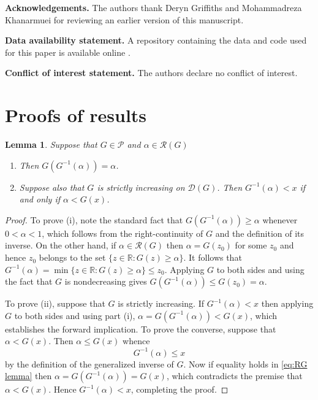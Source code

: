 \documentclass[10pt]{article} %
\theoremstyle{theorem}
\newtheorem{lem}{Lemma}
\theoremstyle{definition}
\newcommand{\RRR}{\mathbb{R}}
\newcommand{\RG}{\mathcal{R}(G)}
\begin{document}
\vspace{0.2cm}

\noindent\textbf{Acknowledgements.} The authors thank Deryn Griffiths and Mohammadreza Khanarmuei for reviewing an earlier version of this manuscript.

\vspace{0.2cm}

\noindent\textbf{Data availability statement.} A repository containing the data and code used for this paper is available online \citep{taggart2026code}.

\vspace{0.2cm}

\noindent\textbf{Conflict of interest statement.} The authors declare no conflict of interest.



\appendix

\section{Proofs of results}\label{a:proofs}



\begin{lem}\label{lem:alpha in RG}
Suppose that $G\in\mathcal{P}$ and $\alpha\in\RG$
\begin{enumerate}
\item[(i)] Then $G(G^{-1}(\alpha))=\alpha$.
\item[(ii)] Suppose also that $G$ is strictly increasing on $\mathcal{D}(G)$. Then $G^{-1}(\alpha) < x$ if and only if $\alpha < G(x)$.
\end{enumerate}
\end{lem}

\begin{proof}
To prove (i), note the standard fact that $G(G^{-1}(\alpha))\geq \alpha$ whenever $0<\alpha<1$, which follows from the right-continuity of $G$ and the definition of its inverse. On the other hand, if $\alpha\in\RG$ then $\alpha=G(z_0)$ for some $z_0$ and hence $z_0$ belongs to the set $\{z\in\RRR: G(z)\geq \alpha\}$. It follows that $G^{-1}(\alpha)=\min\{z\in\RRR: G(z)\geq \alpha\}\leq z_0$. Applying $G$ to both sides and using the fact that $G$ is nondecreasing gives $G(G^{-1}(\alpha))\leq G(z_0)=\alpha$.

To prove (ii), suppose that $G$ is strictly increasing. If $G^{-1}(\alpha) < x$ then applying $G$ to both sides and using part (i), $\alpha = G(G^{-1}(\alpha)) < G(x)$, which establishes the forward implication. To prove the converse, suppose that $\alpha<G(x)$. Then $\alpha\leq G(x)$ whence
\begin{equation}\label{eq:RG lemma}
G^{-1}(\alpha) \leq x
\end{equation}
by the definition of the generalized inverse of $G$. Now if equality holds in \eqref{eq:RG lemma} then $\alpha=G(G^{-1}(\alpha))=G(x)$, which contradicts the premise that $\alpha<G(x)$. Hence $G^{-1}(\alpha) < x$, completing the proof.
\end{proof}
\end{document}
